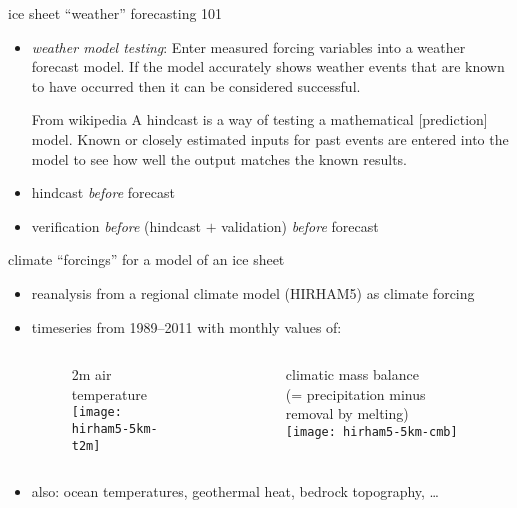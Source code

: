 \documentclass[hide notes,intlimits]{beamer}
\begin{document}
\begin{frame}{ice sheet ``weather'' forecasting 101}

\begin{itemize}
\item \emph{weather model testing}:  Enter measured forcing variables into a weather forecast model.  If the model accurately shows weather events that are known to have occurred then it can be considered successful.
\bigskip

  \begin{block}{From wikipedia} A \alert{hindcast} is a way of testing a
mathematical [prediction] model. Known or closely estimated inputs for past events
are entered into the model to see how well the output matches the
known results.
  \end{block}

\bigskip
\item hindcast \emph{before} forecast
\item verification \emph{before} (hindcast $+$ validation) \emph{before} forecast
\end{itemize}
\end{frame}


\begin{frame}{climate ``forcings'' for a model of an ice sheet}
  \begin{itemize}
  \item reanalysis from a regional climate model \scriptsize (HIRHAM5) \normalsize as climate forcing
  \item timeseries from 1989--2011 with monthly values of:

  \bigskip

 \begin{columns}[c]
    \begin{column}{.5\linewidth}
      \vspace{-.5cm}
      \begin{figure}
        2m air temperature \phantom{$\bigg|$} \\
        \texttt{[image: hirham5-5km-t2m]}
     \end{figure}
    \end{column}
    \begin{column}{.5\linewidth}
      \vspace{-.5cm}
      \begin{figure}
        climatic mass balance\\
        \scriptsize (= precipitation minus removal by melting) \normalsize\\
        \texttt{[image: hirham5-5km-cmb]}
     \end{figure}
    \end{column}
  \end{columns}

  \item also: ocean temperatures, geothermal heat, bedrock topography, \dots
  \end{itemize}
\end{frame}
\end{document}
